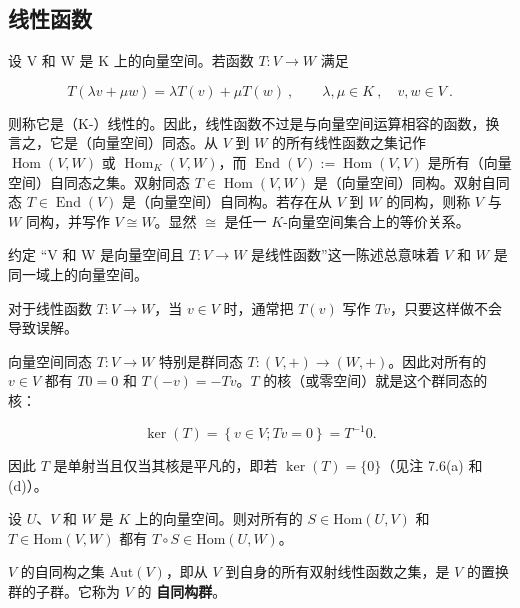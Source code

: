 \subsection*{线性函数}

设 V 和 W 是 K 上的向量空间。若函数  $ T: V \to W $ 满足

\[
T(\lambda v+\mu w)=\lambda T(v)+\mu T(w)~,\qquad\lambda,\mu\in K~,\quad v,w\in V~.
\]

则称它是（K-）线性的。因此，线性函数不过是与向量空间运算相容的函数，换言之，它是（向量空间）同态。从 $V$ 到 $W$ 的所有线性函数之集记作 $\operatorname{Hom}(V, W)$ 或 $\operatorname{Hom}_K(V, W)$，而 $\operatorname{End}(V) := \operatorname{Hom}(V, V)$ 是所有（向量空间）自同态之集。双射同态 $T \in \operatorname{Hom}(V, W)$ 是（向量空间）同构。双射自同态 $T \in \operatorname{End}(V)$ 是（向量空间）自同构。若存在从 $V$ 到 $W$ 的同构，则称 $V$ 与 $W$ 同构，并写作 $V \cong W$。显然 $\cong$ 是任一 $K$-向量空间集合上的等价关系。

约定 “V 和 W 是向量空间且 $T:V\to W$ 是线性函数”这一陈述总意味着 $V$ 和 $W$ 是同一域上的向量空间。

\begin{remark}

\begin{items}
\item

对于线性函数 $T: V \to W$，当 $v \in V$ 时，通常把 $T(v)$ 写作 $Tv$，只要这样做不会导致误解。

\item

向量空间同态 $T: V \to W$ 特别是群同态 $T: (V,+) \to (W,+)$。因此对所有的 $v \in V$ 都有 $T0 = 0$ 和 $T(-v) = -Tv$。$T$ 的核（或零空间）就是这个群同态的核：

\[
\ker(T)=\left\{v\in V;Tv=0\right\}=T^{-1}0.
\]

因此 $T$ 是单射当且仅当其核是平凡的，即若 $\ker(T) = \{0\}$（见注 7.6(a) 和 (d)）。

\item

设 $U$、$V$ 和 $W$ 是 $K$ 上的向量空间。则对所有的 $S \in \mathrm{Hom}(U, V)$ 和 $T \in \mathrm{Hom}(V, W)$ 都有 $T \circ S \in \mathrm{Hom}(U, W)$。

\item

$ V $ 的自同构之集  $ \text{Aut}(V) $，即从  $ V $ 到自身的所有双射线性函数之集，是  $ V $ 的置换群的子群。它称为  $ V $ 的 \textbf{自同构群}。

\end{items}

\end{remark}

